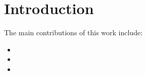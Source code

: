 \section{Introduction}
\label{sec:intro}


\vspace{3pt}
\noindent
The main contributions of this work include:

\begin{itemize}[topsep=3pt,itemsep=1ex,partopsep=0ex,parsep=0ex,leftmargin=*]
\item {}
\item {}
\item {}
\end{itemize}
